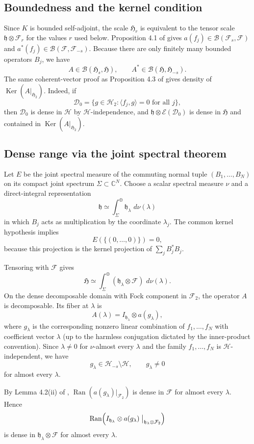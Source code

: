 \documentclass[11pt]{article}
\newcommand{\hhilb}{\mathfrak h}
\newcommand{\HH}{\mathcal H}
\newcommand{\FF}{\mathcal F}
\newcommand{\G}{\mathfrak H}
\newcommand{\ran}{\operatorname{Ran}}
\newcommand{\kerop}{\operatorname{Ker}}
\newcommand{\dd}{\,d}
\begin{document}
\subsection*{Boundedness and the kernel condition}

Since $K$ is bounded self-adjoint, the scale $\G_r$ is equivalent to the tensor
scale $\hhilb\otimes\FF_r$ for the values $r$ used below. Proposition 4.1 of
\cite{LL} gives $a(f_j)\in\mathcal B(\FF_s,\FF)$ and
$a^*(f_j)\in\mathcal B(\FF,\FF_{-s})$. Because there are only finitely many
bounded operators $B_j$, we have
\[
A\in\mathcal B(\G_s,\G),\qquad A^*\in\mathcal B(\G,\G_{-s}).
\]
The same coherent-vector proof as Proposition 4.3 of \cite{LL} gives density of
$\kerop(A|_{\G_2})$. Indeed, if
\[
\mathcal D_0=\{g\in\HH_2:\langle f_j,g\rangle=0\text{ for all }j\},
\]
then $\mathcal D_0$ is dense in $\HH$ by $\HH$-independence, and
$\hhilb\otimes\mathcal E(\mathcal D_0)$ is dense in $\G$ and contained in
$\kerop(A|_{\G_2})$.

\subsection*{Dense range via the joint spectral theorem}

Let $E$ be the joint spectral measure of the commuting normal tuple
$(B_1,\ldots,B_N)$ on its compact joint spectrum $\Sigma\subset\mathbb C^N$.
Choose a scalar spectral measure $\nu$ and a direct-integral representation
\[
\hhilb\simeq \int_\Sigma^\oplus \hhilb_\lambda\,\dd\nu(\lambda)
\]
in which $B_j$ acts as multiplication by the coordinate $\lambda_j$. The common
kernel hypothesis implies
\[
E(\{(0,\ldots,0)\})=0,
\]
because this projection is the kernel projection of
\(\sum_j B_j^*B_j\).

Tensoring with $\FF$ gives
\[
\G\simeq \int_\Sigma^\oplus (\hhilb_\lambda\otimes\FF)\,\dd\nu(\lambda).
\]
On the dense decomposable domain with Fock component in $\FF_2$, the operator
$A$ is decomposable. Its fiber at $\lambda$ is
\[
A(\lambda)=I_{\hhilb_\lambda}\otimes a(g_\lambda),
\]
where $g_\lambda$ is the corresponding nonzero linear combination of
$f_1,\ldots,f_N$ with coefficient vector $\lambda$ (up to the harmless conjugation
dictated by the inner-product convention). Since $\lambda\ne0$ for $\nu$-almost
every $\lambda$ and the family $f_1,\ldots,f_N$ is $\HH$-independent, we have
\[
g_\lambda\in \HH_{-s}\setminus\HH,\qquad g_\lambda\ne0
\]
for almost every $\lambda$.

By Lemma 4.2(ii) of \cite{LL}, $\ran(a(g_\lambda)|_{\FF_2})$ is dense in $\FF$
for almost every $\lambda$. Hence
\[
\ran\!\left(I_{\hhilb_\lambda}\otimes a(g_\lambda)
\bigm|_{\hhilb_\lambda\otimes\FF_2}\right)
\]
is dense in $\hhilb_\lambda\otimes\FF$ for almost every $\lambda$.
\end{document}
